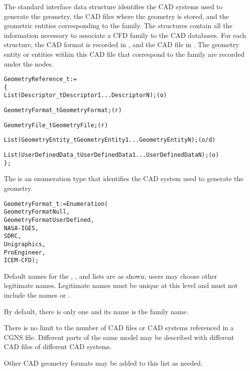The standard interface data structure identifies the CAD systems used
to generate the geometry, the CAD files where the geometry is stored,
and the geometric entities corresponding to the family.
The  structures contain all the information
necessary to associate a CFD family to the CAD databases.
For each  structure, the CAD format
is recorded in , and the CAD file in
.
The geometry entity or entities within this CAD file that correspond to
the family are recorded under the  nodes.

\begin{alltt}
  GeometryReference\_t :=
    \{
    List( Descriptor\_t Descriptor1 ... DescriptorN ) ;                      (o)

    GeometryFormat\_t GeometryFormat ;                                       (r)

    GeometryFile\_t GeometryFile ;                                           (r)

    List (GeometryEntity\_t GeometryEntity1 ... GeometryEntityN) ;           (o/d)

    List( UserDefinedData\_t UserDefinedData1 ... UserDefinedDataN ) ;       (o)
    \} ;
\end{alltt}

The  is an enumeration type that identifies the CAD
system used to generate the geometry.

\begin{alltt}
  GeometryFormat_t := Enumeration(
    GeometryFormatNull,
    GeometryFormatUserDefined,
    NASA-IGES,
    SDRC,
    Unigraphics,
    ProEngineer,
    ICEM-CFD ) ;
\end{alltt}

\begin{notes}
\item
Default names for the , , and
lists are as shown; users may choose other legitimate names.
Legitimate names must be unique at this level and must not include the
names  or .
\item
By default, there is only one  and its name is
the family name.
\item
There is no limit to the number of CAD files or CAD systems referenced
in a CGNS file.
Different parts of the same model may be described with different CAD
files of different CAD systems.
\item
Other CAD geometry formats may be added to this list as needed.
\end{notes}

